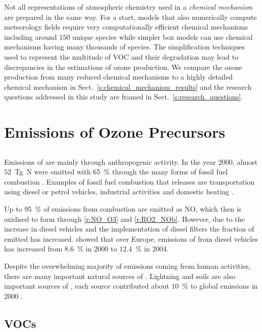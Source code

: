 Not all representations of atmospheric chemistry used in a \emph{chemical mechanism} are prepared in the same way.
For a start, models that also numerically compute meteorology fields require very computationally efficient chemical mechanisms including around $150$ unique species while simpler box models can use chemical mechanisms having many thousands of species.
The simplification techniques used to represent the multitude of VOC and their degradation may lead to discrepancies in the estimations of ozone production.
We compare the ozone production from many reduced chemical mechanisms to a highly detailed chemical mechanism in Sect.~\ref{s:chemical_mechanism_results} and the research questions addressed in this study are framed in Sect.~\ref{s:research_questions}.

\section{Emissions of Ozone Precursors} \label{s:precursor_emissions}
\subsection[NOx]{}
Emissions of  are mainly through anthropogenic activity.
In the year 2000, almost $52$~Tg~N were emitted with 65~\% through the many forms of fossil fuel combustion \citep{Seinfeld:2006}. 
Examples of fossil fuel combustion that releases  are transportation using diesel or petrol vehicles, industrial activities and domestic heating \citep{vonSchneidemesser:2015}.

Up to $95$~\% of  emissions from combustion are emitted as NO, which then is oxidised to form  through \eqref{r:NO_O3} and \eqref{r:RO2_NOb}.
However, due to the increase in diesel vehicles and the implementation of diesel filters the fraction of emitted  has increased.
\citet{Grice:2009} showed that over Europe, emissions of  from diesel vehicles has increased from $8.6$~\% in 2000 to $12.4$~\% in 2004.

Despite the overwhelming majority of  emissions coming from human activities, there are many important natural sources of .
Lightning and soils are also important sources of , each source contributed about $10$~\% to global  emissions in 2000 \citep{Seinfeld:2006}.

\subsection{VOCs}
